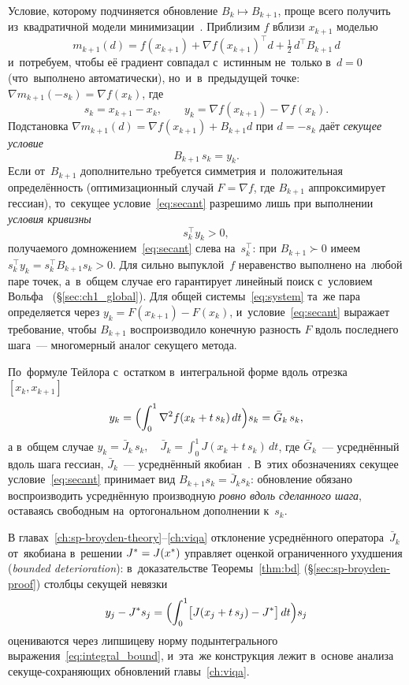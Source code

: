 Условие, которому подчиняется обновление $B_k\mapsto B_{k+1}$, проще
всего получить из~квадратичной модели минимизации~\cite[\S6.1]{bfgs}.
Приблизим $f$ вблизи $x_{k+1}$ моделью
\[
  m_{k+1}(d) = f(x_{k+1}) + \nabla f(x_{k+1})^\top d
               + \tfrac12\, d^\top B_{k+1}\, d
\]
и~потребуем, чтобы её градиент совпадал с~истинным не~только в~$d = 0$
(что~выполнено автоматически), но~и~в~предыдущей точке:
$\nabla m_{k+1}(-s_k)=\nabla f(x_k)$, где
\[
  s_k = x_{k+1} - x_k, \qquad y_k = \nabla f(x_{k+1}) - \nabla f(x_k).
\]
Подстановка $\nabla m_{k+1}(d)=\nabla f(x_{k+1})+B_{k+1}d$ при $d=-s_k$
даёт \emph{секущее условие}
\begin{equation}\label{eq:secant}
  B_{k+1}\, s_k = y_k.
\end{equation}
Если от~$B_{k+1}$ дополнительно требуется симметрия и~положительная
определённость (оптимизационный случай $F=\nabla f$, где $B_{k+1}$
аппроксимирует гессиан), то~секущее условие~\eqref{eq:secant} разрешимо
лишь при выполнении \emph{условия кривизны}
\begin{equation}\label{eq:curvature}
  s_k^\top y_k > 0,
\end{equation}
получаемого домножением~\eqref{eq:secant} слева на~$s_k^\top$: при
$B_{k+1}\succ 0$ имеем $s_k^\top y_k = s_k^\top B_{k+1} s_k > 0$. Для
сильно выпуклой~$f$ неравенство выполнено на~любой паре точек,
а~в~общем случае его гарантирует линейный поиск с~условием
Вольфа~\cite{wolfe1969} (\S\ref{sec:ch1_global}).
Для общей системы~\eqref{eq:system} та~же пара определяется через
$y_k = F(x_{k+1}) - F(x_k)$, и~условие~\eqref{eq:secant} выражает
требование, чтобы $B_{k+1}$ воспроизводило конечную разность $F$ вдоль
последнего шага~--- многомерный аналог секущего метода.

По~формуле
Тейлора с~остатком в~интегральной форме вдоль отрезка $[x_k,x_{k+1}]$
\begin{equation}\label{eq:avg_operator}
  y_k = \Bigl(\int_0^1 \nabla^2 f(x_k + t\,s_k)\,dt\Bigr) s_k
      = \bar G_k\, s_k,
\end{equation}
а в~общем случае $y_k = \bar J_k\, s_k,\quad \bar J_k = \int_0^1 J(x_k + t\,s_k)\,dt$, где $\bar G_k$~--- усреднённый вдоль шага гессиан, $\bar J_k$~---
усреднённый якобиан~\cite[\S6.1]{bfgs}. В~этих обозначениях секущее
условие~\eqref{eq:secant} принимает вид $B_{k+1} s_k = \bar J_k s_k$:
обновление обязано воспроизводить усреднённую производную \emph{ровно
вдоль сделанного шага}, оставаясь свободным на~ортогональном дополнении
к~$s_k$.

В главах~\ref{ch:sp-broyden-theory}--\ref{ch:viqa} отклонение усреднённого оператора~$\bar J_k$
от~якобиана в~решении $J^{*} = J(x^{*})$ управляет оценкой ограниченного
ухудшения (\emph{bounded deterioration}): в~доказательстве
Теоремы~\ref{thm:bd} (\S\ref{sec:sp-broyden-proof}) столбцы секущей
невязки
\[
  y_j - J^{*} s_j
  = \Bigl(\int_0^1 \bigl[J(x_j + t\,s_j) - J^{*}\bigr]\,dt\Bigr) s_j
\]
оцениваются через липшицеву норму подынтегрального
выражения~\eqref{eq:integral_bound}, и~эта~же конструкция лежит в~основе
анализа секуще-сохраняющих обновлений
главы~\ref{ch:viqa}.

